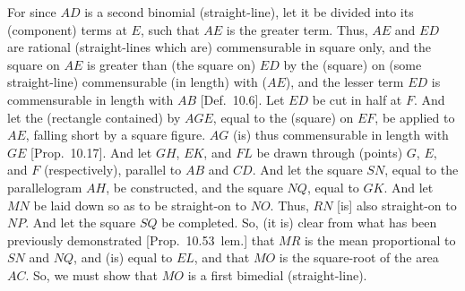 \begin{Parallel}{}{}
{For since $AD$ is a second binomial (straight-line), let it be divided
into its (component) terms at $E$, such that $AE$ is the greater term. Thus,
$AE$ and $ED$ are rational (straight-lines which are) commensurable
in square only, and the square on $AE$ is greater than (the square on)
$ED$ by the (square) on (some straight-line) commensurable (in length) with ($AE$),
and the lesser term $ED$ is commensurable in length with $AB$ [Def.~10.6].  Let $ED$ be cut in half at $F$.
And let the (rectangle contained) by $AGE$, equal to the (square) on $EF$,
 be applied to $AE$, falling short by a square figure. $AG$
(is) thus commensurable in length with $GE$ [Prop.~10.17]. And let $GH$, $EK$, and
$FL$ be drawn through (points) $G$, $E$, and $F$ (respectively), parallel
to $AB$ and $CD$. And let the square $SN$, equal to the parallelogram
$AH$, be constructed, and the square $NQ$, equal to
$GK$.  And let $MN$ be laid down so as to be straight-on to $NO$. Thus,
$RN$ [is] also straight-on to $NP$. And let the square $SQ$ be
completed. So, (it is) clear from what has been previously
demonstrated [Prop.~10.53~lem.] that
$MR$ is the mean proportional to $SN$ and $NQ$, and (is) equal to
$EL$, and that $MO$ is the square-root of the area $AC$. So, we
must show that $MO$ is a first bimedial (straight-line).

}
\end{Parallel}
